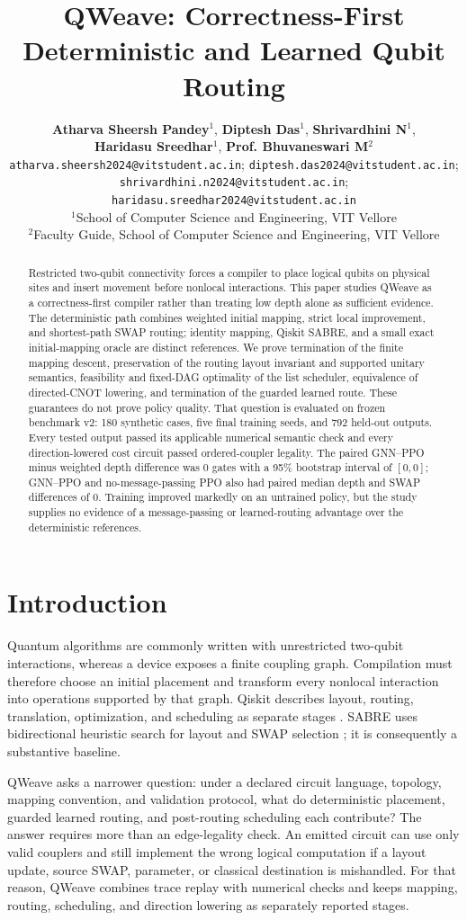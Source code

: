 \documentclass[a4paper,11pt,twocolumn]{article}
\title{\fontsize{14.5}{17}\selectfont\textbf{QWeave: Correctness-First Deterministic and Learned Qubit Routing}}
\author{%
\fontsize{12}{14}\selectfont
\textbf{Atharva Sheersh Pandey}$^{1}$, \textbf{Diptesh Das}$^{1}$,
\textbf{Shrivardhini N}$^{1}$,\\
\textbf{Haridasu Sreedhar}$^{1}$, \textbf{Prof. Bhuvaneswari M}$^{2}$\\[2pt]
\texttt{atharva.sheersh2024@vitstudent.ac.in};
\texttt{diptesh.das2024@vitstudent.ac.in};\\
\texttt{shrivardhini.n2024@vitstudent.ac.in};
\texttt{haridasu.sreedhar2024@vitstudent.ac.in}\\[2pt]
$^{1}$School of Computer Science and Engineering, VIT Vellore\\
$^{2}$Faculty Guide, School of Computer Science and Engineering, VIT Vellore
}
\date{}
\begin{document}
\maketitle
\begin{abstract}
Restricted two-qubit connectivity forces a compiler to place logical qubits
on physical sites and insert movement before nonlocal interactions. This paper
studies QWeave as a correctness-first compiler rather than treating low depth
alone as sufficient evidence. The deterministic path combines weighted initial
mapping, strict local improvement, and shortest-path SWAP routing; identity
mapping, Qiskit SABRE, and a small exact initial-mapping oracle are distinct
references. We prove termination of the finite mapping descent, preservation of
the routing layout invariant and supported unitary semantics, feasibility and
fixed-DAG optimality of the list scheduler, equivalence of directed-CNOT
lowering, and termination of the guarded learned route. These guarantees do not
prove policy quality. That question is evaluated on frozen benchmark v2:
180 synthetic cases, five final training seeds, and 792 held-out outputs.
Every tested output passed its applicable numerical semantic check and every
direction-lowered cost circuit passed ordered-coupler legality. The paired
GNN--PPO minus weighted depth difference was 0 gates with a 95\% bootstrap
interval of $[0,0]$; GNN--PPO and no-message-passing PPO also had paired median
depth and SWAP differences of 0. Training improved markedly on an untrained
policy, but the study supplies no evidence of a message-passing or
learned-routing advantage over the deterministic references.
\end{abstract}

\section{Introduction}
Quantum algorithms are commonly written with unrestricted two-qubit
interactions, whereas a device exposes a finite coupling graph. Compilation
must therefore choose an initial placement and transform every nonlocal
interaction into operations supported by that graph. Qiskit describes layout,
routing, translation, optimization, and scheduling as separate stages
\citep{ibmtranspiler}. SABRE uses bidirectional heuristic search for layout and
SWAP selection \citep{li2019sabre}; it is consequently a substantive baseline.

QWeave asks a narrower question: under a declared circuit language, topology,
mapping convention, and validation protocol, what do deterministic placement,
guarded learned routing, and post-routing scheduling each contribute? The
answer requires more than an edge-legality check. An emitted circuit can use
only valid couplers and still implement the wrong logical computation if a
layout update, source SWAP, parameter, or classical destination is mishandled.
For that reason, QWeave combines trace replay with numerical checks and keeps
mapping, routing, scheduling, and direction lowering as separately reported
stages.
\end{document}
